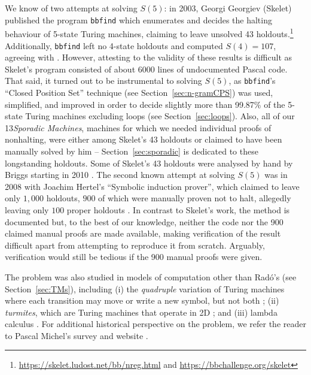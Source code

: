 \documentclass[a4paper,british]{article}
\theoremstyle{definition} %
\numberwithin{equation}{section}
\theoremstyle{definition} %
\newcommand{\rado}{Rad\'o\xspace}
\newcommand{\numSporadic}{13\xspace}
\begin{document}
We know of two attempts at solving $S(5)$: in 2003, Georgi Georgiev (Skelet) published the program \texttt{bbfind} \cite{Skelet_bbfind} which enumerates and decides the halting behaviour of 5-state Turing machines, claiming to leave unsolved 43 holdouts.\footnote{\url{https://skelet.ludost.net/bb/nreg.html} and \url{https://bbchallenge.org/skelet}} Additionally, \texttt{bbfind} left no 4-state holdouts and computed $S(4) = 107$, agreeing with \cite{Brady83}. However, attesting to the validity of these results is difficult as Skelet's program consisted of about 6000 lines of undocumented Pascal code. That said, it turned out to be instrumental to solving $S(5)$, as \texttt{bbfind}'s ``Closed Position Set'' technique (see Section~\ref{sec:n-gramCPS}) was used, simplified, and improved in order to decide slightly more than 99.87\% of the 5-state Turing machines excluding loops (see Section~\ref{sec:loops}). Also, all of our \numSporadic \textit{Sporadic Machines}, \ie machines for which we needed individual proofs of nonhalting, were either among Skelet's 43 holdouts or claimed to have been manually solved by him -- Section~\ref{sec:sporadic} is dedicated to these longstanding holdouts. Some of Skelet's 43 holdouts were analysed by hand by Briggs starting in 2010 \cite{DanBriggs}. The second known attempt at solving $S(5)$ was in 2008 with Joachim Hertel's ``Symbolic induction prover'', which claimed to leave only $1{,}000$ holdouts, $900$ of which were manually proven not to halt, allegedly leaving only $100$ proper holdouts \cite{Hertel}. In contrast to Skelet's work, the method is documented but, to the best of our knowledge, neither the code nor the 900 claimed manual proofs are made available, making verification of the result difficult apart from attempting to reproduce it from scratch. Arguably, verification would still be tedious if the 900 manual proofs were given.

The \BBfull problem was also studied in models of computation other than \rado's (see Section~\ref{sec:TMs}), including (i) the \textit{quadruple} variation of Turing machines where each transition may move or write a new symbol, but not both \cite{Ross2003,Ross2005}; (ii) \textit{turmites}, which are Turing machines that operate in 2D \cite{BradyMeaningOfLife}; and (iii) lambda calculus \cite{tromp_oeis}. For additional historical perspective on the \BBfull problem, we refer the reader to Pascal Michel's survey and website \cite{michel2019busy,PMichel_website}.
\end{document}
